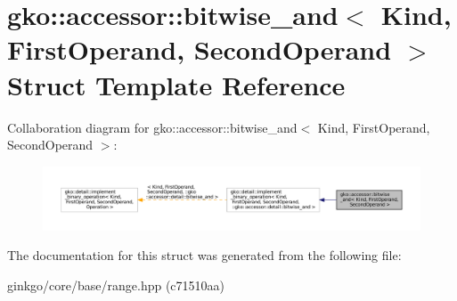 \hypertarget{structgko_1_1accessor_1_1bitwise__and}{}\section{gko\+:\+:accessor\+:\+:bitwise\+\_\+and$<$ Kind, First\+Operand, Second\+Operand $>$ Struct Template Reference}
\label{structgko_1_1accessor_1_1bitwise__and}


Collaboration diagram for gko\+:\+:accessor\+:\+:bitwise\+\_\+and$<$ Kind, First\+Operand, Second\+Operand $>$\+:
\nopagebreak
\begin{figure}[H]
\begin{center}
\leavevmode
\includegraphics[width=350pt]{structgko_1_1accessor_1_1bitwise__and__coll__graph}
\end{center}
\end{figure}


The documentation for this struct was generated from the following file\+:\begin{DoxyCompactItemize}
\item 
ginkgo/core/base/range.\+hpp (c71510aa)\end{DoxyCompactItemize}
